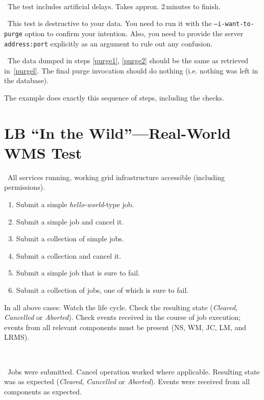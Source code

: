 \how\ 

\note\ The test includes artificial delays. Takes approx. 2\,minutes to finish.

\note\ This test is destructive to your data. You need to run it with the \texttt{--i-want-to-purge} option to confirm your intention. Also, you need to provide the \LB server \texttt{address:port} explicitly as an argument to rule out any confusion. 

\result\ The data dumped in steps \ref{purge1}, \ref{purge2} should be the
same as retrieved in~\ref{purgel}. The final purge invocation should
do nothing (i.e. nothing was left in the database).

\begin{hints}
The example  does exactly this sequence of steps,
including the checks.
\end{hints}

\section{LB ``In the Wild''---Real-World WMS Test}
\req\ All \LB services running, working grid infrastructure accessible (including permissions). 

\what
\begin{enumerate}
\item Submit a simple \emph{hello-world}-type job.
\item Submit a simple job and cancel it.
\item Submit a collection of simple jobs.
\item Submit a collection and cancel it. 
\item Submit a simple job that is sure to fail.
\item Submit a collection of jobs, one of which is sure to fail. 
\end{enumerate}

In all above cases: Watch the life cycle. Check the resulting state (\emph{Cleared}, \emph{Cancelled} or \emph{Aborted}). Check events received in the course of job execution; events from all relevant components must be present (NS, WM, JC, LM, and LRMS). 

\how\ 

\result\ Jobs were submitted. Cancel operation worked where applicable. Resulting state was as expected (\emph{Cleared}, \emph{Cancelled} or \emph{Aborted}). Events were received from all components as expected.

